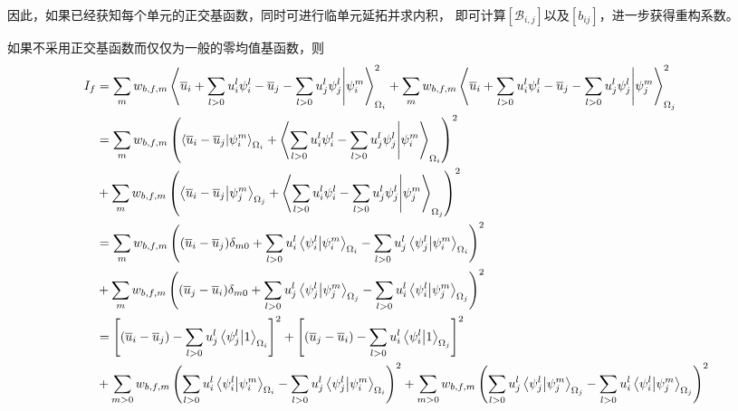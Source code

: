 \documentclass[UTF8,zihao=5]{ctexart} %
\newcommand*{\mean}[1]{\overline{#1}}
\begin{document}
因此，如果已经获知每个单元的正交基函数，同时可进行临单元延拓并求内积，
即可计算$[\mathcal{B}_{i,j}]$以及$[b_{ij}]$，进一步获得重构系数。

如果不采用正交基函数而仅仅为一般的零均值基函数，则
$$
    \begin{aligned}
        I_f & =
        \sum_{m}
        {
            w_{b,f,m}
            \innerproduct{\mean{u}_i + \sum_{l>0}{u_i^l\psi_i^l} - \mean{u}_j - \sum_{l>0}{u_j^l\psi_j^l} }{\psi_i^m}_{\Omega_i}^2
        }
        +
        \sum_{m}
        {
            w_{b,f,m}
            \innerproduct{\mean{u}_i + \sum_{l>0}{u_i^l\psi_i^l} - \mean{u}_j - \sum_{l>0}{u_j^l\psi_j^l} }{\psi_j^m}_{\Omega_j}^2
        }          \\
            & =
        \sum_{m}
        {w_{b,f,m}\left(
            \innerproduct{\mean{u}_i - \mean{u}_j}{\psi_i^m}_{\Omega_i}
            +
            \innerproduct{\sum_{l>0}{u_i^l\psi_i^l} - \sum_{l>0}{u_j^l\psi_j^l} }{\psi_i^m}_{\Omega_i}
            \right)^2}
        \\
            & +
        \sum_{m}
        {w_{b,f,m}\left(
            \innerproduct{\mean{u}_i - \mean{u}_j}{\psi_j^m}_{\Omega_j}
            +
            \innerproduct{\sum_{l>0}{u_i^l\psi_i^l} - \sum_{l>0}{u_j^l\psi_j^l} }{\psi_j^m}_{\Omega_j}
        \right)^2} \\
            & =
        \sum_{m}
        {w_{b,f,m}\left(
            (\mean{u}_i - \mean{u}_j)\delta_{m0}
            +
            \sum_{l>0}u_i^l\innerproduct{\psi_i^l}{\psi_i^m}_{\Omega_i}
            - \sum_{l>0}u_j^l\innerproduct{\psi_j^l}{\psi_i^m}_{\Omega_i}
            \right)^2}
        \\
            & +
        \sum_{m}
        {w_{b,f,m}\left(
            (\mean{u}_j - \mean{u}_i)\delta_{m0}
            +
            \sum_{l>0}u_j^l\innerproduct{\psi_j^l}{\psi_j^m}_{\Omega_j}
            - \sum_{l>0}u_i^l\innerproduct{\psi_i^l}{\psi_j^m}_{\Omega_j}
        \right)^2} \\
            & =
        \left[
            (\mean{u}_i - \mean{u}_j)
            - \sum_{l>0}u_j^l\innerproduct{\psi_j^l}{1}_{\Omega_i}
            \right]^2
        +
        \left[
            (\mean{u}_j - \mean{u}_i)
            - \sum_{l>0}u_i^l\innerproduct{\psi_i^l}{1}_{\Omega_j}
        \right]^2  \\
            & +
        \sum_{m>0}
        {w_{b,f,m}\left(
            \sum_{l>0}u_i^l\innerproduct{\psi_i^l}{\psi_i^m}_{\Omega_i}
            - \sum_{l>0}u_j^l\innerproduct{\psi_j^l}{\psi_i^m}_{\Omega_i}
            \right)^2}
        +
        \sum_{m>0}
        {w_{b,f,m}\left(
            \sum_{l>0}u_j^l\innerproduct{\psi_j^l}{\psi_j^m}_{\Omega_j}
            - \sum_{l>0}u_i^l\innerproduct{\psi_i^l}{\psi_j^m}_{\Omega_j}
        \right)^2} \\
    \end{aligned}
$$
\end{document}

